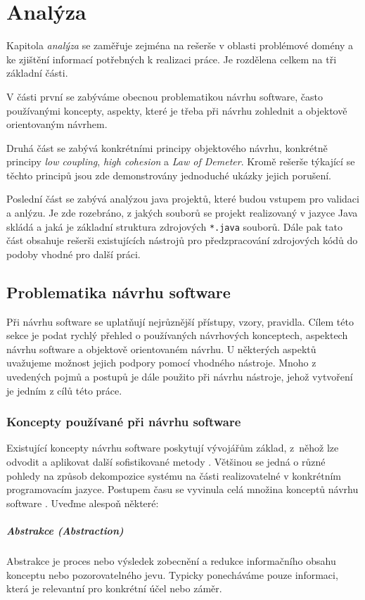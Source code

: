 \chapter{Analýza}
Kapitola \emph{analýza} se zaměřuje zejména na rešerše v oblasti problémové domény a ke zjištění informací potřebných k realizaci práce. Je rozdělena celkem na tři základní části.

V části první se zabýváme obecnou problematikou návrhu software, často používanými koncepty, aspekty, které je třeba při návrhu zohlednit a objektově orientovaným návrhem.

Druhá část se zabývá konkrétními principy objektového návrhu, konkrétně principy \emph{low coupling}, \emph{high cohesion} a \emph{Law of Demeter}. Kromě rešerše týkající se těchto principů jsou zde demonstrovány jednoduché ukázky jejich porušení.

Poslední část se zabývá analýzou java projektů, které budou vstupem pro validaci a anlýzu. Je zde rozebráno, z jakých souborů se projekt realizovaný v jazyce Java skládá a jaká je základní struktura zdrojových \verb+*.java+ souborů. Dále pak tato část obsahuje rešerši existujících nástrojů pro předzpracování zdrojových kódů do podoby vhodné pro další práci.
\section{Problematika návrhu software}
Při návrhu software se uplatňují nejrůznější přístupy, vzory, pravidla. Cílem této sekce je podat rychlý přehled o používaných návrhových konceptech, aspektech návrhu software a objektově orientovaném návrhu. U některých aspektů uvažujeme možnost jejich podpory pomocí vhodného nástroje. Mnoho z uvedených pojmů a postupů je dále použito při návrhu nástroje, jehož vytvoření je jedním z cílů této práce.

\subsection{Koncepty používané při návrhu software}
Existující koncepty návrhu software poskytují vývojářům základ, z~něhož lze odvodit a aplikovat další sofistikované metody \cite{wiki:software_design}. Většinou se jedná o různé pohledy na způsob dekompozice systému na části realizovatelné v konkrétním programovacím jazyce. Postupem času se vyvinula celá množina konceptů návrhu software \cite{swengineeringconcepts}. Uveďme alespoň některé:

\paragraph{Abstrakce (Abstraction)} Abstrakce je proces nebo výsledek zobecnění a redukce informačního obsahu konceptu nebo pozorovatelného jevu. Typicky ponecháváme pouze informaci, která je relevantní pro konkrétní účel nebo záměr.

